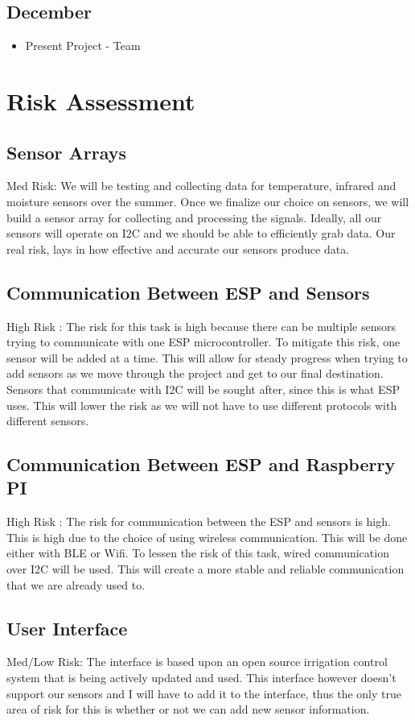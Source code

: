 \documentclass[letterpaper, 10 pt, conference]{ieeeconf}  %
\begin{document}
\subsection{December}
\begin{itemize}
    \item Present Project - Team
\end{itemize}

\section{Risk Assessment}
\subsection{Sensor Arrays}
Med Risk: We will be testing and collecting data for temperature, infrared and moisture sensors over the summer. Once we finalize our choice on sensors, we will build a sensor array for collecting and processing the signals. Ideally, all our sensors will operate on I2C and we should be able to efficiently grab data. Our real risk, lays in how effective and accurate our sensors produce data.

\subsection{Communication Between ESP and Sensors}
High Risk : The risk for this task is high because there can be multiple sensors trying to communicate with one ESP microcontroller. To mitigate this risk, one sensor will be added at a time. This will allow for steady progress when trying to add sensors as we move through the project and get to our final destination. Sensors that communicate with I2C will be sought after, since this is what ESP uses. This will lower the risk as we will not have to use different protocols with different sensors.

\subsection{Communication Between ESP and Raspberry PI}
High Risk : The risk for communication between the ESP and sensors is high. This is high due to the choice of using wireless communication. This will be done either with BLE or Wifi. To lessen the risk of this task, wired communication over I2C will be used. This will create a more stable and reliable communication that we are already used to. 

\subsection{User Interface}
Med/Low Risk: The interface is based upon an open source irrigation control system that is being actively updated and used. This interface however doesn't support our sensors and I will have to add it to the interface, thus the only true area of risk for this is whether or not we can add new sensor information.
\end{document}
